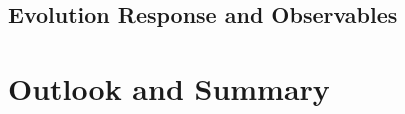 \documentclass[aps,prl,twocolumn,groupedaddress]{revtex4-1}
\begin{document}
	
	
	
	\subsection{Evolution Response and Observables}
\section{Outlook and Summary}

%



%
\end{document}
